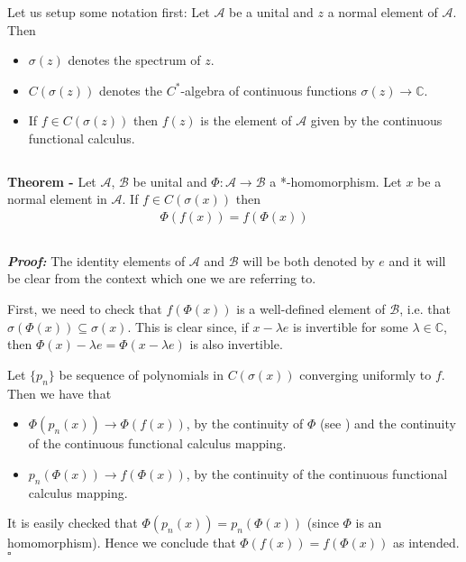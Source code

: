 \documentclass[12pt]{article}
\begin{document}
Let us setup some notation first: Let $\mathcal{A}$ be a unital  and $z$ a normal element of  $\mathcal{A}$. Then
\begin{itemize}
\item $\sigma(z)$ denotes the spectrum of $z$.
\item $C(\sigma(z))$ denotes the $C^*$-algebra of continuous functions $\sigma(z) \longrightarrow \mathbb{C}$.
\item If $f \in C(\sigma(z))$ then $f(z)$ is the element of $\mathcal{A}$ given by the continuous functional calculus.
\end{itemize}

$\,$

{\bf Theorem -} Let $\mathcal{A}$, $\mathcal{B}$ be unital  and $\Phi :\mathcal{A} \longrightarrow \mathcal{B}$ a *-homomorphism. Let $x$ be a normal element in $\mathcal{A}$. If $f \in C(\sigma(x))$ then
\begin{align*}
\Phi(f(x)) = f(\Phi(x))
\end{align*}

$\,$

{\bf \emph{Proof:}} The identity elements of $\mathcal{A}$ and $\mathcal{B}$ will be both denoted by $e$ and it will be clear from the context which one we are referring to.

First, we need to check that $f(\Phi(x))$ is a well-defined element of $\mathcal{B}$, i.e. that $\sigma(\Phi(x)) \subseteq \sigma(x)$. This is clear since, if $x - \lambda e$ is invertible for some $\lambda \in \mathbb{C}$, then $\Phi(x)-\lambda e = \Phi(x- \lambda e)$ is also invertible.

Let $\{p_n\}$ be sequence of polynomials in $C(\sigma(x))$ converging uniformly to $f$. Then we have that
\begin{itemize}
\item $\Phi(p_n(x)) \longrightarrow \Phi(f(x))$, by the continuity of $\Phi$ (see ) and the continuity of the continuous functional calculus mapping.
\end{itemize}
\begin{itemize}
\item $p_n(\Phi(x)) \longrightarrow f(\Phi(x))$, by the continuity of the continuous functional calculus mapping.
\end{itemize}

It is easily checked that $\Phi(p_n(x)) = p_n(\Phi(x))$ (since $\Phi$ is an homomorphism). Hence we conclude that $\Phi(f(x)) = f(\Phi(x))$ as intended. $\square$
\end{document}
